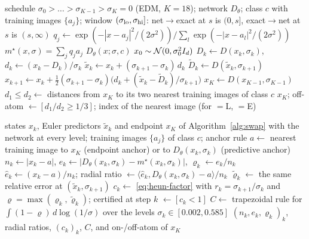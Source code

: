 \documentclass{article} %
\theoremstyle{plain}
\theoremstyle{definition}
\theoremstyle{remark}
\begin{document}
\begin{algorithm}[t]
\caption{Hybrid Heun sampler with the exact field on a window of noise levels}
\label{alg:swap}
\begin{algorithmic}[1]
\Require schedule $\sigma_0>\dots>\sigma_{K-1}>\sigma_K=0$ (EDM, $K=18$); network $D_\theta$; class $c$
  with training images $\{a_j\}$; window $(\sigma_{\rm lo},\sigma_{\rm hi}]$: net$\to$exact at $s$
  is $(0,s]$, exact$\to$net at $s$ is $(s,\infty)$
    \State $q_j\gets\exp(-|x-a_j|^2/(2\sigma^2))\big/\sum_l\exp(-|x-a_l|^2/(2\sigma^2))$
    \State \Return $m^\star(x,\sigma)=\sum_jq_ja_j$
  \Else
    \State \Return $D_\theta(x;\sigma,c)$
  \EndIf
\EndFunction
\State $x_0\sim\mathcal{N}(0,\sigma_0^2I_d)$
  \State $D_k\gets D(x_k,\sigma_k)$, \quad $d_k\gets(x_k-D_k)/\sigma_k$
  \State $\tilde x_k\gets x_k+(\sigma_{k+1}-\sigma_k)\,d_k$
  \State $\tilde D_k\gets D(\tilde x_k,\sigma_{k+1})$
  \State $x_{k+1}\gets x_k+\tfrac12(\sigma_{k+1}-\sigma_k)\big(d_k+(\tilde x_k-\tilde D_k)/\sigma_{k+1}\big)$
\EndFor
\State $x_K\gets D(x_{K-1},\sigma_{K-1})$
\State $d_1\le d_2\gets$ distances from $x_K$ to its two nearest training images of class $c$
\State \Return $x_K$; off-atom $\gets[d_1/d_2\ge1/3]$; index of the nearest image (for $=$L, $=$E)
\end{algorithmic}
\end{algorithm}

\begin{algorithm}[t]
\caption{Relative error, radial ratio, late contraction and Heun certificate along one trajectory}
\label{alg:measure}
\begin{algorithmic}[1]
\Require states $x_k$, Euler predictors $\tilde x_k$ and endpoint $x_K$ of Algorithm~\ref{alg:swap}
  with the network at every level; training images $\{a_j\}$ of class $c$; anchor rule
  \State $a\gets$ nearest training image to $x_K$ (endpoint anchor) or to $D_\theta(x_k,\sigma_k)$
    (predictive anchor)
  \State $n_k\gets|x_k-a|$, \quad $e_k\gets|D_\theta(x_k,\sigma_k)-m^\star(x_k,\sigma_k)|$, \quad
    $\varrho_k\gets e_k/n_k$
  \State $\hat e_k\gets(x_k-a)/n_k$; \quad radial ratio $\gets\langle\hat e_k,D_\theta(x_k,\sigma_k)-a\rangle/n_k$
  \State $\tilde\varrho_k\gets$ the same relative error at $(\tilde x_k,\sigma_{k+1})$ 
  \State $c_k\gets$ \eqref{eq:heun-factor} with $r_k=\sigma_{k+1}/\sigma_k$ and
    $\varrho=\max(\varrho_k,\tilde\varrho_k)$; certified at step $k$ $\gets[c_k<1]$
\EndFor
\State $C\gets$ trapezoidal rule for $\int(1-\varrho)\,d\log(1/\sigma)$ over the levels
  $\sigma_k\in[0.002,0.585]$ 
\State \Return $(n_k,e_k,\varrho_k)_k$, radial ratios, $(c_k)_k$, $C$, and on-/off-atom of $x_K$
\end{algorithmic}
\end{algorithm}
\end{document}
